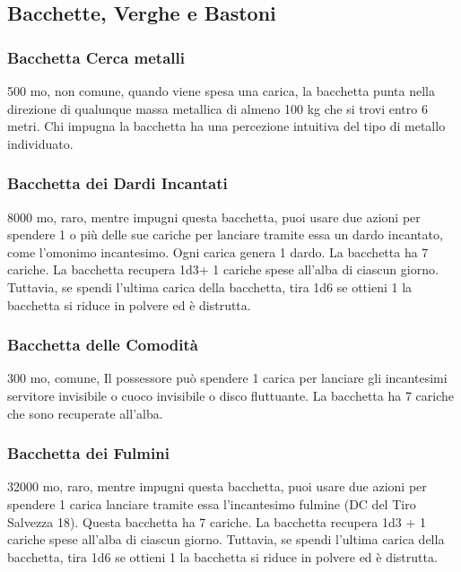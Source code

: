 \begin{multicols}{2}
	\subsection{Bacchette, Verghe e Bastoni}

	\subsubsection*{Bacchetta Cerca metalli}
	500 mo, non comune, quando viene spesa una carica, la bacchetta punta nella direzione di qualunque massa metallica di almeno 100 kg che si trovi entro 6 metri. Chi impugna la bacchetta ha una percezione intuitiva del tipo di metallo individuato.

	\subsubsection*{Bacchetta dei Dardi Incantati}
	8000 mo, raro, mentre impugni questa bacchetta, puoi usare due azioni per spendere 1 o più delle sue cariche per lanciare tramite essa un dardo incantato, come l'omonimo incantesimo. Ogni carica genera 1 dardo. La bacchetta ha 7 cariche. La bacchetta recupera 1d3+ 1 cariche spese all'alba di ciascun giorno. Tuttavia, se spendi l'ultima carica della bacchetta, tira 1d6 se ottieni 1 la bacchetta si riduce in polvere ed è distrutta.

	\subsubsection*{Bacchetta delle Comodità}
	300 mo, comune, Il possessore può spendere 1 carica per lanciare gli incantesimi servitore invisibile o cuoco invisibile o disco fluttuante. La bacchetta ha 7 cariche che sono recuperate all'alba.

	\subsubsection*{Bacchetta dei Fulmini}
	32000 mo, raro, mentre impugni questa bacchetta, puoi usare due azioni per spendere 1 carica lanciare tramite essa l'incantesimo fulmine (DC del Tiro Salvezza 18).
	Questa bacchetta ha 7 cariche. La bacchetta recupera 1d3 + 1 cariche spese all'alba di ciascun giorno. Tuttavia, se spendi l'ultima carica della bacchetta, tira 1d6 se ottieni 1 la bacchetta si riduce in polvere ed è distrutta.


\end{multicols}
